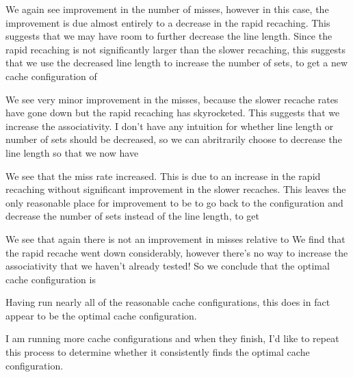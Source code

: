 
We again see improvement in the number of misses, however in this case, the improvement is due almost entirely to a decrease in the rapid recaching. This suggests that we may have room to further decrease the line length. Since the rapid recaching is not significantly larger than the slower recaching, this suggests that we use the decreased line length to increase the number of sets, to get a new cache configuration of %


We see very minor improvement in the misses, because the slower recache rates have gone down but the rapid recaching has skyrocketed. This suggests that we increase the associativity. I don't have any intuition for whether line length or number of sets should be decreased, so we can abritrarily choose to decrease the line length so that we now have %


We see that the miss rate increased. This is due to an increase in the rapid recaching without significant improvement in the slower recaches. This leaves the only reasonable place for improvement to be to go back to the 
configuration and decrease the number of sets instead of the line length, to get %


We see that again there is not an improvement in misses relative to 
We find that the rapid recache went down considerably, however there's no way to increase the associativity that we haven't already tested! So we conclude that the optimal cache configuration is %

Having run nearly all of the reasonable cache configurations, this does in fact appear to be the optimal cache configuration.

I am running more cache configurations and when they finish, I'd like to repeat this process to determine whether it consistently finds the optimal cache configuration.